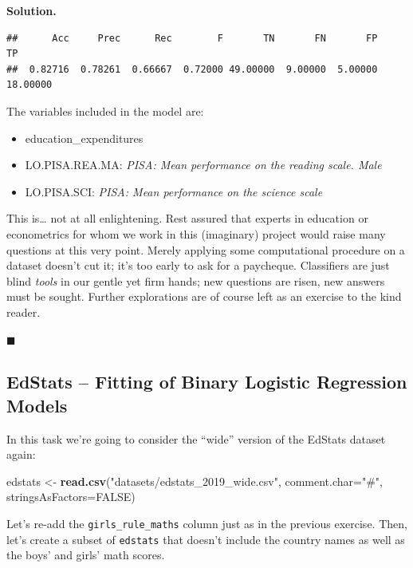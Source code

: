 \documentclass[10pt,b5paper,krantz1]{krantz}
\newenvironment{Shaded}{\begin{snugshade}}{\end{snugshade}}
\newcommand{\DataTypeTok}[1]{\textcolor[rgb]{0.27,0.27,0.27}{#1}}
\newcommand{\KeywordTok}[1]{\textcolor[rgb]{0.27,0.27,0.27}{\textbf{#1}}}
\newcommand{\NormalTok}[1]{#1}
\newcommand{\OtherTok}[1]{\textcolor[rgb]{0.37,0.37,0.37}{#1}}
\newcommand{\StringTok}[1]{\textcolor[rgb]{0.5,0.5,0.5}{#1}}
\providecommand{\tightlist}{%
  \setlength{\itemsep}{0pt}\setlength{\parskip}{0pt}}
\newenvironment{solution}{%
\bigskip\noindent\textbf{Solution. }%
\it\ignorespaces%
\ignorespaces%
}{\ignorespaces%
\hfill$\blacksquare$%
}
\begin{document}
\begin{solution}
\begin{verbatim}
##      Acc     Prec      Rec        F       TN       FN       FP       TP 
##  0.82716  0.78261  0.66667  0.72000 49.00000  9.00000  5.00000 18.00000
\end{verbatim}

The variables included in the model are:

\begin{itemize}
\tightlist
\item
  education\_expenditures
\item
  LO.PISA.REA.MA: \emph{PISA: Mean performance on the reading scale. Male}
\item
  LO.PISA.SCI: \emph{PISA: Mean performance on the science scale}
\end{itemize}

This is\ldots{} not at all enlightening.
Rest assured that experts in education
or econometrics for whom we work in this (imaginary) project
would raise many questions at this very point. Merely applying
some computational procedure on a dataset doesn't cut it;
it's too early to ask for a paycheque.
Classifiers are just blind \emph{tools} in our gentle yet firm hands;
new questions are risen, new answers must be sought. Further
explorations are of course left as an exercise to the kind reader.

\end{solution}

\hypertarget{edstats-fitting-of-binary-logistic-regression-models}{%
\subsection{EdStats -- Fitting of Binary Logistic Regression Models}\label{edstats-fitting-of-binary-logistic-regression-models}}

In this task we're going to
consider the ``wide'' version of the EdStats
dataset again:

\begin{Shaded}
\begin{Highlighting}[]
\NormalTok{edstats <-}\StringTok{ }\KeywordTok{read.csv}\NormalTok{(}\StringTok{"datasets/edstats_2019_wide.csv"}\NormalTok{,}
    \DataTypeTok{comment.char=}\StringTok{"#"}\NormalTok{, }\DataTypeTok{stringsAsFactors=}\OtherTok{FALSE}\NormalTok{)}
\end{Highlighting}
\end{Shaded}

Let's re-add the \texttt{girls\_rule\_maths} column
just as in the previous exercise.
Then, let's create a subset of \texttt{edstats} that doesn't include
the country names as well as the boys' and girls' math scores.
\end{document}
